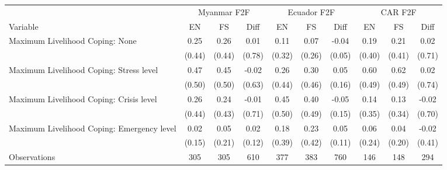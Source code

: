 \begin{tabular}{l*{9}c}
\hline\hline
 & \multicolumn{3}{c}{Myanmar F2F} & \multicolumn{3}{c}{Ecuador F2F} & \multicolumn{3}{c}{CAR F2F}\\ 
Variable & EN & FS & Diff & EN & FS & Diff & EN & FS & Diff \\
\hline
Maximum Livelihood Coping: None&0.25&0.26&0.01&0.11&0.07&-0.04&0.19&0.21&0.02\\
&(0.44)&(0.44)&(0.78)&(0.32)&(0.26)&(0.05)&(0.40)&(0.41)&(0.71)\\
Maximum Livelihood Coping: Stress level&0.47&0.45&-0.02&0.26&0.30&0.05&0.60&0.62&0.02\\
&(0.50)&(0.50)&(0.63)&(0.44)&(0.46)&(0.16)&(0.49)&(0.49)&(0.74)\\
Maximum Livelihood Coping: Crisis level&0.26&0.24&-0.01&0.45&0.40&-0.05&0.14&0.13&-0.02\\
&(0.44)&(0.43)&(0.71)&(0.50)&(0.49)&(0.15)&(0.35)&(0.34)&(0.70)\\
Maximum Livelihood Coping: Emergency level&0.02&0.05&0.02&0.18&0.23&0.05&0.06&0.04&-0.02\\
&(0.15)&(0.21)&(0.12)&(0.39)&(0.42)&(0.11)&(0.24)&(0.20)&(0.41)\\
\hline
Observations & 305 & 305 & 610 & 377 & 383 & 760 & 146 & 148 & 294 \\
\hline\hline
\end{tabular}

